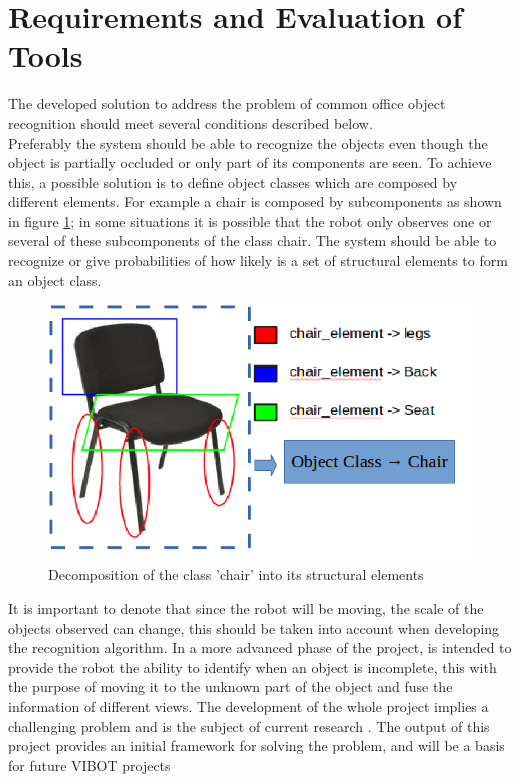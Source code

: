 \documentclass[fontsize=12pt]{article}
\begin{document}
\section{Requirements and Evaluation of Tools}
 \label{sec:toolseval}
The developed solution to address the problem of common office object recognition should meet several conditions described below.\\
Preferably the system should be able to recognize the objects even though the object is partially occluded or only part of its components are seen. To achieve this, a possible solution is to define object classes which are composed by different elements. For example a chair is composed by subcomponents as shown in figure \ref{fig:chair}; in some situations it is possible that the robot only observes one or several of these subcomponents of the class chair. The system should be able to recognize or give probabilities of how likely is a set of structural elements to form an object class.

\begin{figure}[H]
\begin{center}
\includegraphics[width=0.5\linewidth]{images/chair}
\caption{Decomposition of the class 'chair' into its structural elements}
\label{fig:chair}
\end{center}
\end{figure}
It is important to denote that since the robot will be moving, the scale of the objects observed can change, this should be taken into account when developing the recognition algorithm.
In a more advanced phase of the project, is intended to provide the robot the ability to identify when an object is incomplete, this with the purpose of moving it to the unknown part of the object and fuse the information of different views. 
The development of the whole project implies a challenging problem and is the subject of current research \cite{bib:semantic}. The output of this project provides an initial framework for solving the problem, and will be a basis for future VIBOT projects \\
\end{document}
